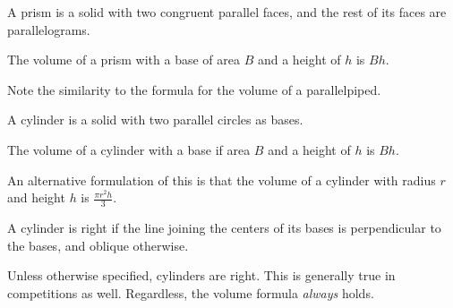 \documentclass[mast]{lucky}
\begin{document}
\begin{defi}[Prism]
A prism is a solid with two congruent parallel faces, and the rest of its faces are parallelograms.
\end{defi}

\begin{theo}
The volume of a prism with a base of area $B$ and a height of $h$ is $Bh.$
\end{theo}
Note the similarity to the formula for the volume of a parallelpiped.

\begin{defi}[Cylinder]
A cylinder is a solid with two parallel circles as bases.
\end{defi}

\begin{theo}
The volume of a cylinder with a base if area $B$ and a height of $h$ is $Bh.$
\end{theo}
An alternative formulation of this is that the volume of a cylinder with radius $r$ and height $h$ is $\frac{\pi r^2h}{3}.$

\begin{defi}
A cylinder is right if the line joining the centers of its bases is perpendicular to the bases, and oblique otherwise.
\end{defi}
Unless otherwise specified, cylinders are right. This is generally true in competitions as well. Regardless, the volume formula \textit{always} holds.
\end{document}
